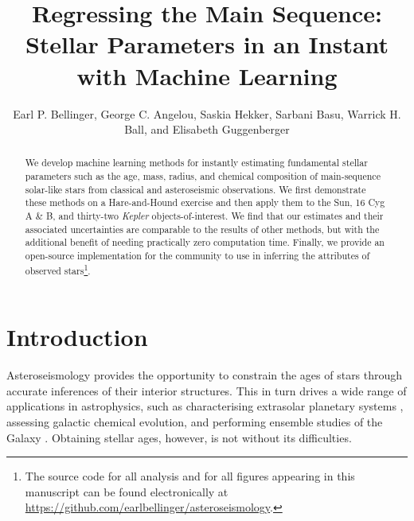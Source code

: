 \documentclass[manuscript]{aastex}
\begin{document}
\title{Regressing the Main Sequence:\\Stellar Parameters in an Instant with Machine Learning}

\author{Earl P. Bellinger, George C. Angelou, Saskia Hekker, Sarbani Basu, Warrick H. Ball, and Elisabeth Guggenberger}


\begin{abstract}
We develop machine learning methods for instantly estimating fundamental stellar parameters such as the age, mass, radius, and chemical composition of main-sequence solar-like stars from classical and asteroseismic observations. We first demonstrate these methods on a Hare-and-Hound exercise and then apply them to the Sun, 16 Cyg A \& B, and thirty-two \emph{Kepler} objects-of-interest. We find that our estimates and their associated uncertainties are comparable to the results of other methods, but with the additional benefit of needing practically zero computation time. Finally, we provide an open-source implementation for the community to use in inferring the attributes of observed stars\footnote{The source code for all analysis and for all figures appearing in this manuscript can be found electronically at \url{https://github.com/earlbellinger/asteroseismology}.}. 
\end{abstract}




\section{Introduction}

Asteroseismology provides the opportunity to constrain the ages of stars through accurate inferences of their interior structures. This in turn drives a wide range of applications in astrophysics, such as characterising extrasolar planetary systems \citep{2015ApJ...799..170C,2015MNRAS.452.2127S}, assessing galactic chemical evolution, and performing ensemble studies of the Galaxy \citep{2011Sci...332..213C, 2013MNRAS.429..423M, 2014ApJS..210....1C}. Obtaining stellar ages, however, is not without its difficulties. 
\end{document}
